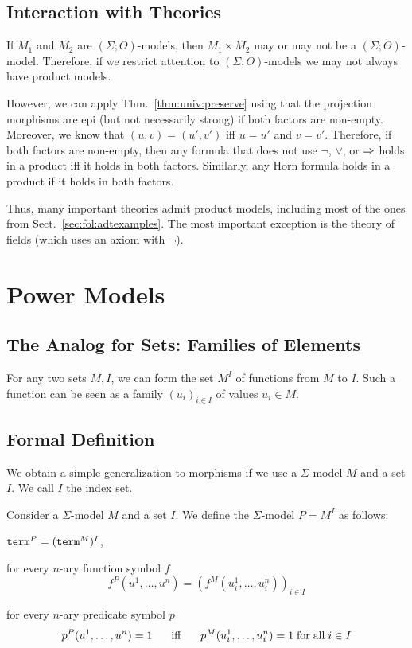 \subsection{Interaction with Theories}

If $M_1$ and $M_2$ are $(\Sigma;\Theta)$-models, then $M_1\times M_2$ may or may not be a $(\Sigma;\Theta)$-model.
Therefore, if we restrict attention to $(\Sigma;\Theta)$-models we may not always have product models.

However, we can apply Thm.~\ref{thm:univ:preserve} using that the projection morphisms are epi (but not necessarily strong) if both factors are non-empty.
Moreover, we know that $(u,v)=(u',v')$ iff $u=u'$ and $v=v'$.
Therefore, if both factors are non-empty, then any formula that does not use $\neg$, $\vee$, or $\Rightarrow$ holds in a product iff it holds in both factors.
Similarly, any Horn formula holds in a product if it holds in both factors.

Thus, many important theories admit product models, including most of the ones from Sect.~\ref{sec:fol:adtexamples}.
The most important exception is the theory of fields (which uses an axiom with $\neg$). 

\section{Power Models}\label{sec:univ:exp}

\subsection{The Analog for Sets: Families of Elements}

For any two sets $M,I$, we can form the set $M^I$ of functions from $M$ to $I$.
Such a function can be seen as a family $(u_i)_{i\in I}$ of values $u_i\in M$.

\subsection{Formal Definition}

We obtain a simple generalization to morphisms if we use a $\Sigma$-model $M$ and a set $I$.
We call $I$ the index set.

\begin{definition}
Consider a $\Sigma$-model $M$ and a set $I$.
We define the $\Sigma$-model $P=M^I$ as follows:
\begin{compactitem}
\item $\mathtt{term}^{P}=(\mathtt{term}^{M})^I$,
\item for every $n$-ary function symbol $f$
 \[f^{P}(u^1,\ldots,u^n)=(f^{M}(u^1_i,\ldots,u^n_i))_{i\in I}\]
\item for every $n$-ary predicate symbol $p$
 \[p^{P}(u^1,\ldots,u^n)=1 \hspace*{.5cm}\;\mathrm{iff}\;\hspace*{.5cm} p^{M}(u^1_i,\ldots,u^n_i)=1 \;\mathrm{for}\;\mathrm{all}\; i\in I\]
\end{compactitem}
\end{definition}

